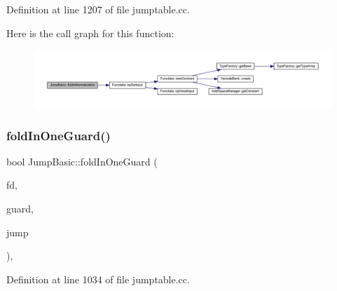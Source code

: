 Definition at line 1207 of file jumptable.\+cc.

Here is the call graph for this function\+:
\nopagebreak
\begin{figure}[H]
\begin{center}
\leavevmode
\includegraphics[width=350pt]{class_jump_basic_a4f3c7e75f6b89afd01e64950959e114d_cgraph}
\end{center}
\end{figure}
\mbox{\label{class_jump_basic_a27ac3c21abdfc602f857802a7479c6d4}} 
\subsubsection{\texorpdfstring{foldInOneGuard()}{foldInOneGuard()}}
{\footnotesize\ttfamily bool Jump\+Basic\+::fold\+In\+One\+Guard (\begin{DoxyParamCaption}\item[{\mbox{\hyperlink{class_funcdata}{Funcdata}} $\ast$}]{fd,  }\item[{\mbox{\hyperlink{class_guard_record}{Guard\+Record}} \&}]{guard,  }\item[{\mbox{\hyperlink{class_jump_table}{Jump\+Table}} $\ast$}]{jump }\end{DoxyParamCaption})\hspace{0.3cm}{\ttfamily [protected]}, {\ttfamily [virtual]}}



Definition at line 1034 of file jumptable.\+cc.

